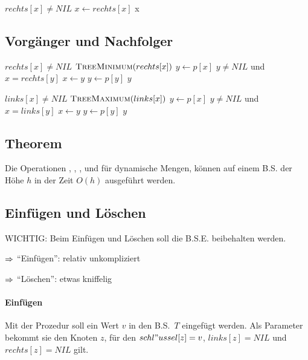 \documentclass[a4paper,twoside,DIV15,BCOR12mm]{scrbook}
\begin{document}
\begin{codebox}
\li \While $rechts[x] \neq NIL$
\li 	\Do $x \gets rechts[x]$
		\End
\li	\Return x
\end{codebox}

\subsection{Vorgänger und Nachfolger}
\begin{codebox}
\li	\If $rechts[x] \neq NIL$
\li		\Then \Return $\textnormal{\scshape TreeMinimum}(rechts[x])$
		\End
\li $y \gets p[x]$
\li \While $y \neq NIL$ und $x=rechts[y]$
\li		\Do $x \gets y$
\li				$y \gets p[y]$
		\End
\li \Return $y$
\end{codebox}

\begin{codebox}
\li	\If $links[x] \neq NIL$
\li		\Then \Return $\textnormal{\scshape TreeMaximum}(links[x])$
		\End
\li $y \gets p[x]$
\li \While $y \neq NIL$ und $x=links[y]$
\li		\Do $x \gets y$
\li				$y \gets p[y]$
		\End
\li \Return $y$
\end{codebox}

\subsection{Theorem}
Die Operationen , , ,  und 
 für dynamische Mengen, können auf einem B.S. der Höhe $h$
in der Zeit $O(h)$ ausgeführt werden.

\subsection{Einfügen und Löschen}
WICHTIG: Beim Einfügen und Löschen soll die B.S.E. beibehalten werden.
\begin{description}
\item{$\Rightarrow$} "`Einfügen"': relativ unkompliziert
\item{$\Rightarrow$} "`Löschen"': etwas kniffelig
\end{description}

\paragraph{Einfügen}

Mit der Prozedur  soll ein Wert $v$ in den B.S.\ $T$ eingefügt werden. Als Parameter bekommt sie
den Knoten $z$, für den $schl"ussel[z] = v$, $links[z]=NIL$ und $rechts[z]=NIL$ gilt.
\end{document}
